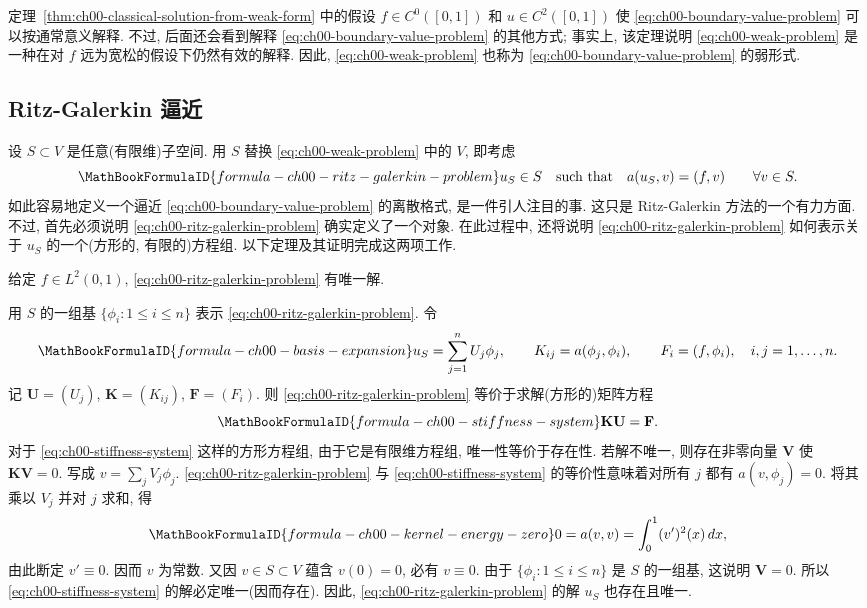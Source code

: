 定理~\ref{thm:ch00-classical-solution-from-weak-form} 中的假设 $f\in C^0([0,1])$ 和 $u\in C^2([0,1])$ 使 \eqref{eq:ch00-boundary-value-problem} 可以按通常意义解释. 不过, 后面还会看到解释 \eqref{eq:ch00-boundary-value-problem} 的其他方式; 事实上, 该定理说明 \eqref{eq:ch00-weak-problem} 是一种在对 $f$ 远为宽松的假设下仍然有效的解释. 因此, \eqref{eq:ch00-weak-problem} 也称为 \eqref{eq:ch00-boundary-value-problem} 的弱形式.

\subsection{Ritz-Galerkin 逼近}
\label{sec:ch00-ritz-galerkin-approximation}

设 $S\subset V$ 是任意(有限维)子空间. 用 $S$ 替换 \eqref{eq:ch00-weak-problem} 中的 $V$, 即考虑
\setcounter{equation}{0}
\begin{equation}
\MathBookFormulaID{formula-ch00-ritz-galerkin-problem}
u_S\in S\quad\text{such that}\quad a(u_S,v)=(f,v)\qquad\forall v\in S.
\label{eq:ch00-ritz-galerkin-problem}
\end{equation}
如此容易地定义一个逼近 \eqref{eq:ch00-boundary-value-problem} 的离散格式, 是一件引人注目的事. 这只是 Ritz-Galerkin 方法的一个有力方面. 不过, 首先必须说明 \eqref{eq:ch00-ritz-galerkin-problem} 确实定义了一个对象. 在此过程中, 还将说明 \eqref{eq:ch00-ritz-galerkin-problem} 如何表示关于 $u_S$ 的一个(方形的, 有限的)方程组. 以下定理及其证明完成这两项工作.

\setcounter{thmcount}{1}
\begin{Theorem}
\label{thm:ch00-ritz-galerkin-unique-solution}
给定 $f\in L^2(0,1)$, \eqref{eq:ch00-ritz-galerkin-problem} 有唯一解.
\end{Theorem}

\begin{Proof}
用 $S$ 的一组基 $\{\phi_i:1\leq i\leq n\}$ 表示 \eqref{eq:ch00-ritz-galerkin-problem}. 令
\[
\MathBookFormulaID{formula-ch00-basis-expansion}
u_S=\sum_{j=1}^nU_j\phi_j,
\qquad K_{ij}=a(\phi_j,\phi_i),
\qquad F_i=(f,\phi_i),
\quad i,j=1,\ldots,n.
\]
记 $\mathbf U=(U_j)$, $\mathbf K=(K_{ij})$, $\mathbf F=(F_i)$. 则 \eqref{eq:ch00-ritz-galerkin-problem} 等价于求解(方形的)矩阵方程
\setcounter{equation}{2}
\begin{equation}
\MathBookFormulaID{formula-ch00-stiffness-system}
\mathbf K\mathbf U=\mathbf F.
\label{eq:ch00-stiffness-system}
\end{equation}
对于 \eqref{eq:ch00-stiffness-system} 这样的方形方程组, 由于它是有限维方程组, 唯一性等价于存在性. 若解不唯一, 则存在非零向量 $\mathbf V$ 使 $\mathbf K\mathbf V=0$. 写成 $v=\sum_jV_j\phi_j$. \eqref{eq:ch00-ritz-galerkin-problem} 与 \eqref{eq:ch00-stiffness-system} 的等价性意味着对所有 $j$ 都有 $a(v,\phi_j)=0$. 将其乘以 $V_j$ 并对 $j$ 求和, 得
\[
\MathBookFormulaID{formula-ch00-kernel-energy-zero}
0=a(v,v)=\int_0^1(v')^2(x)\,dx,
\]
由此断定 $v'\equiv0$. 因而 $v$ 为常数. 又因 $v\in S\subset V$ 蕴含 $v(0)=0$, 必有 $v\equiv0$. 由于 $\{\phi_i:1\leq i\leq n\}$ 是 $S$ 的一组基, 这说明 $\mathbf V=0$. 所以 \eqref{eq:ch00-stiffness-system} 的解必定唯一(因而存在). 因此, \eqref{eq:ch00-ritz-galerkin-problem} 的解 $u_S$ 也存在且唯一.
\end{Proof}

